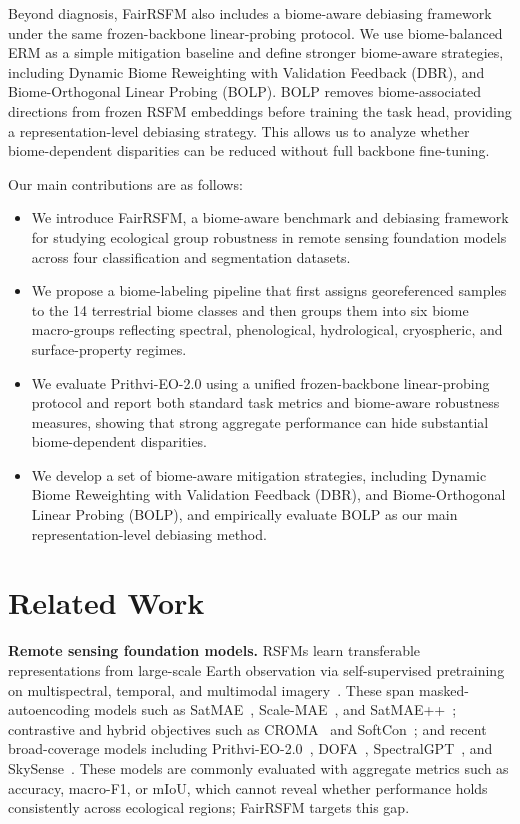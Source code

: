 \documentclass[10pt,twocolumn,letterpaper]{article}
\newcommand{\method}{FairRSFM\xspace}
\begin{document}
Beyond diagnosis, \method also includes a biome-aware debiasing framework under the same frozen-backbone linear-probing protocol. We use biome-balanced ERM as a simple mitigation baseline and define stronger biome-aware strategies, including  Dynamic Biome Reweighting with Validation Feedback (DBR), and Biome-Orthogonal Linear Probing (BOLP). BOLP removes biome-associated directions from frozen RSFM embeddings before training the task head, providing a representation-level debiasing strategy. This allows us to analyze whether biome-dependent disparities can be reduced without full backbone fine-tuning.

Our main contributions are as follows:
\begin{itemize}[leftmargin=*]
    \item We introduce \method, a biome-aware benchmark and debiasing framework for studying ecological group robustness in remote sensing foundation models across four classification and segmentation datasets.

    \item We propose a biome-labeling pipeline that first assigns georeferenced samples to the 14 terrestrial biome classes and then groups them into six biome macro-groups reflecting spectral, phenological, hydrological, cryospheric, and surface-property regimes.

    \item We evaluate Prithvi-EO-2.0 using a unified frozen-backbone linear-probing protocol and report both standard task metrics and biome-aware robustness measures, showing that strong aggregate performance can hide substantial biome-dependent disparities.
        
    \item We develop a set of biome-aware mitigation strategies, including Dynamic Biome Reweighting with Validation Feedback (DBR), and Biome-Orthogonal Linear Probing (BOLP), and empirically evaluate BOLP as our main representation-level debiasing method.
\end{itemize}

\section{Related Work}

\noindent\textbf{Remote sensing foundation models.} RSFMs learn transferable representations from large-scale Earth observation via self-supervised pretraining on multispectral, temporal, and multimodal imagery~\cite{rsfm_survey_multimodal}. These span masked-autoencoding models such as SatMAE~\cite{satmae}, Scale-MAE~\cite{scalemae}, and SatMAE++~\cite{satmaepp}; contrastive and hybrid objectives such as CROMA~\cite{croma} and SoftCon~\cite{softcon}; and recent broad-coverage models including Prithvi-EO-2.0~\cite{prithvi2}, DOFA~\cite{dofa}, SpectralGPT~\cite{spectralgpt}, and SkySense~\cite{skysense}. These models are commonly evaluated with aggregate metrics such as accuracy, macro-F1, or mIoU, which cannot reveal whether performance holds consistently across ecological regions; \method targets this gap.
\end{document}
